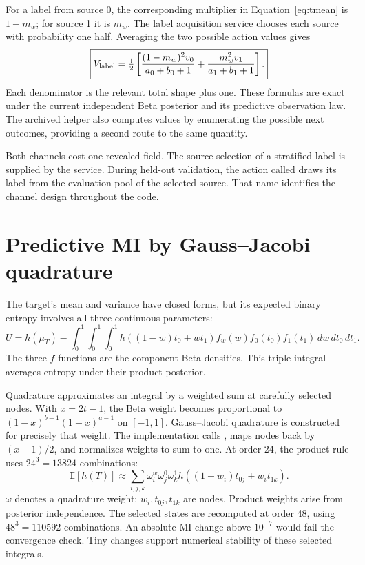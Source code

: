 \documentclass[11pt,a4paper]{report}
\newcommand{\E}{\mathbb E}
\newcommand{\code}[1]{\texttt{\detokenize{#1}}}
\begin{document}
For a label from source 0, the corresponding multiplier in Equation~\eqref{eq:tmean} is $1-m_w$; for source 1 it is $m_w$. The label acquisition service chooses each source with probability one half. Averaging the two possible action values gives
\begin{equation}
\boxed{V_{\rm label}=\tfrac12\left[
\frac{(1-m_w)^2v_0}{a_0+b_0+1}
+\frac{m_w^2v_1}{a_1+b_1+1}\right].}
\label{eq:vlabel}
\end{equation}
Each denominator is the relevant total shape plus one. These formulas are exact under the current independent Beta posterior and its predictive observation law. The archived helper also computes values by enumerating the possible next outcomes, providing a second route to the same quantity.

Both channels cost one revealed field. The source selection of a stratified label is supplied by the service. During held-out validation, the action called \code{reference_label} draws its label from the evaluation pool of the selected source. That name identifies the channel design throughout the code.

\section{Predictive MI by Gauss--Jacobi quadrature}
The target's mean and variance have closed forms, but its expected binary entropy involves all three continuous parameters:
\begin{equation}
U=h(\mu_T)-\int_0^1\int_0^1\int_0^1
h((1-w)t_0+wt_1)f_w(w)f_0(t_0)f_1(t_1)\,dw\,dt_0\,dt_1.
\end{equation}
The three $f$ functions are the component Beta densities. This triple integral averages entropy under their product posterior.

Quadrature approximates an integral by a weighted sum at carefully selected nodes. With $x=2t-1$, the Beta weight becomes proportional to $(1-x)^{b-1}(1+x)^{a-1}$ on $[-1,1]$. Gauss--Jacobi quadrature is constructed for precisely that weight. The implementation calls \code{roots_jacobi(order,b-1,a-1)}, maps nodes back by $(x+1)/2$, and normalizes weights to sum to one. At order 24, the product rule uses $24^3=13824$ combinations:
\begin{equation}
\E[h(T)]\approx\sum_{i,j,k}\omega_i^w\omega_j^0\omega_k^1
h((1-w_i)t_{0j}+w_it_{1k}).
\end{equation}
$\omega$ denotes a quadrature weight; $w_i,t_{0j},t_{1k}$ are nodes. Product weights arise from posterior independence. The selected states are recomputed at order 48, using $48^3=110592$ combinations. An absolute MI change above $10^{-7}$ would fail the convergence check. Tiny changes support numerical stability of these selected integrals.
\end{document}

